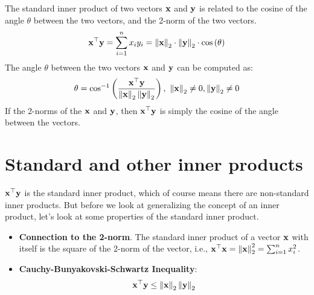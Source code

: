 The standard inner product of two vectors $\mathbf{x}$ and $\mathbf{y}$ is related to the cosine of the angle $\theta$ between the two vectors, and the 2-norm of the two vectors.
\[ \mathbf{x}^\top\mathbf{y} = \sum_{i=1}^n x_i y_i = \left\lVert \mathbf{x} \right\rVert_2 \cdot \left\lVert \mathbf{y} \right\rVert_2 \cdot \cos\left( \theta\right) \]
The angle $\theta$ between the two vectors $\mathbf{x}$ and $\mathbf{y}$ can be computed as:
\[ \theta = \cos^{-1}\left( \frac{\mathbf{x}^\top \mathbf{y}}{\left\lVert \mathbf{x} \right\rVert_2 \left\lVert \mathbf{y} \right\rVert_2}\right), \,\, \left\lVert \mathbf{x} \right\rVert_2 \neq 0, \left\lVert \mathbf{y} \right\rVert_2 \neq 0 \]
If the 2-norms of the $\mathbf{x}$ and $\mathbf{y}$, then $\mathbf{x}^\top\mathbf{y}$ is simply the cosine of the angle between the vectors.

\section{Standard and other inner products}
$\mathbf{x}^\top\mathbf{y}$ is the standard inner product, which of course means there are non-standard inner products. But before we look at generalizing the concept of an inner product, let's look at some properties of the standard inner product.
\begin{itemize}
    \item \textbf{Connection to the 2-norm}. The standard inner product of a vector $\mathbf{x}$ with itself is the square of the 2-norm of the vector, i.e., $\mathbf{x}^\top\mathbf{x} = \left\lVert \mathbf{x} \right\rVert_2^2 = \sum_{i=1}^n x_i^2$.
    \item \textbf{Cauchy-Bunyakovski-Schwartz Inequality}:
    \begin{equation}
        \mathbf{x}^\top\mathbf{y} \leq \left\lVert \mathbf{x} \right\rVert_2 \left\lVert \mathbf{y} \right\rVert_2
        \label{eq:cauchy-schwartz}
    \end{equation}
\end{itemize}

